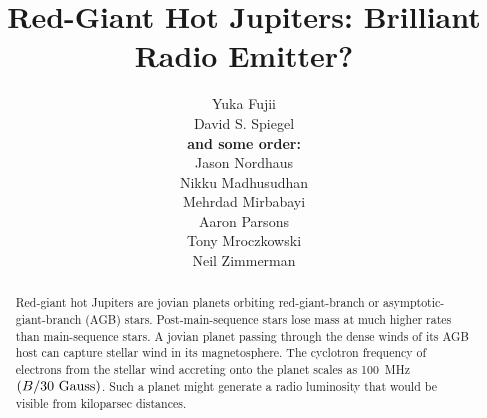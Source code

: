 \documentclass{emulateapj}
\begin{document}

\title{Red-Giant Hot Jupiters: Brilliant Radio Emitter?}


\author{
%
Yuka Fujii \\
%
David S. Spiegel \\
%
{\bf and some order:} \\
%
Jason Nordhaus \\
%
Nikku Madhusudhan \\
%
Mehrdad Mirbabayi \\
%
Aaron Parsons \\
%
Tony Mroczkowski \\
%
Neil Zimmerman
}

  








\vspace{0.5\baselineskip}



\begin{abstract}
  Red-giant hot Jupiters are jovian planets orbiting red-giant-branch
  or asymptotic-giant-branch (AGB) stars.  Post-main-sequence stars
  lose mass at much higher rates than main-sequence stars.  A jovian
  planet passing through the dense winds of its AGB host can capture
  stellar wind in its magnetosphere.  The cyclotron frequency of
  electrons from the stellar wind accreting onto the planet scales as
  100~MHz~$(B/30 {\rm~Gauss})$.  Such a planet might generate a radio
  luminosity that would be visible from kiloparsec distances.
\end{abstract}
\end{document}
